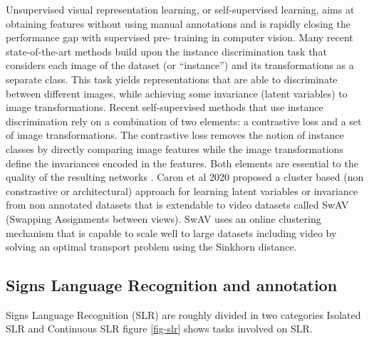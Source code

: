 Unsupervised visual representation learning, or self-supervised learning, aims at obtaining features without using manual annotations and is rapidly closing the performance gap with supervised pre- training in computer vision. Many recent state-of-the-art methods build upon the instance discrimination task that considers each image of the dataset (or “instance”) and its transformations as a separate class. This task yields representations that are able to discriminate between different images, while achieving some invariance (latent variables) to image transformations. Recent self-supervised methods that use instance discrimination rely on a combination of two elements: a contrastive loss and a set of image transformations. The contrastive loss removes the notion of instance classes by directly comparing image features while the image transformations define the invariances encoded in the features. Both elements are essential to the quality of the resulting networks \cite{caron2020unsupervised}. Caron et al 2020 proposed a cluster based (non constrastive or architectural) approach for learning latent variables or invariance from non annotated datasets that is extendable to video datasets called SwAV (Swapping Assignments between views). SwAV uses an online clustering mechanism that is capable to scale well to large datasets including video by solving an optimal transport problem using the Sinkhorn distance. 

\subsection{Signs Language Recognition and annotation}
Signs Language Recognition (SLR) are roughly divided in two categories Isolated SLR and Continuous SLR\cite{adaloglou2020comprehensive} figure \ref{fig-slr} shows tasks involved on SLR.

